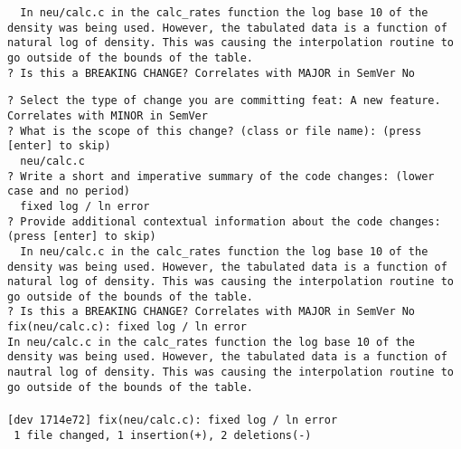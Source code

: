 \documentclass{ol-softwaremanual}
\begin{document}
\begin{enumerate}
\begin{terminal}
\texttt{\color{orange} \ In neu/calc.c in the calc\_rates function the log base 10 of the density was being used. However, the tabulated data is a function of natural log of density. This was causing the interpolation routine to go outside of the bounds of the table.} \\
\texttt{{\color{orange}?} Is this a BREAKING CHANGE? Correlates with MAJOR in SemVer {\color{orange}No}}
\end{terminal}
\begin{terminal}
\texttt{{\color{orange}?} Select the type of change you are committing {\color{orange}feat: A new feature. Correlates with MINOR in SemVer}}\\
\texttt{{\color{orange}?} What is the scope of this change? (class or file name): (press [enter] to skip)}\\
\texttt{ \color{orange}\ neu/calc.c}\\
\texttt{{\color{orange}?} Write a short and imperative summary of the code changes: (lower case and no period)}\\
\texttt{ \color{orange}\ fixed log / ln error} \\
\texttt{{\color{orange}?} Provide additional contextual information about the code changes: (press [enter] to skip)} \\
\texttt{\color{orange} \ In neu/calc.c in the calc\_rates function the log base 10 of the density was being used. However, the tabulated data is a function of natural log of density. This was causing the interpolation routine to go outside of the bounds of the table.} \\
\texttt{{\color{orange}?} Is this a BREAKING CHANGE? Correlates with MAJOR in SemVer {\color{orange}No}}\\
\texttt{\color{cyan}fix(neu/calc.c): fixed log / ln error}\\

\texttt{\color{cyan}In neu/calc.c in the calc\_rates function the log base 10 of the density was being used. However, the tabulated data is a function of nautral log of density. This was causing the interpolation routine to go outside of the bounds of the table.}\\ \\


\texttt{[dev 1714e72] fix(neu/calc.c): fixed log / ln error}\\
\texttt{ 1 file changed, 1 insertion(+), 2 deletions(-)} \\


\end{terminal}
\end{enumerate}
\end{document}
